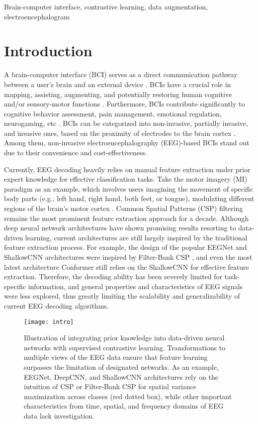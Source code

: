 \documentclass[journal]{IEEEtran}
\begin{document}
\begin{IEEEkeywords}
Brain-computer interface, contrastive learning, data augmentation, electroencephalogram
\end{IEEEkeywords}

\section{Introduction}
A brain-computer interface (BCI) serves as a direct communication pathway between a user's brain and an external device \cite{Rosenfeld2017}. BCIs have a crucial role in mapping, assisting, augmenting, and potentially restoring human cognitive and/or sensory-motor functions \cite{Krucoff2016}. Furthermore, BCIs contribute significantly to cognitive behavior assessment, pain management, emotional regulation, neurogaming, etc \cite{van2012brain}. BCIs can be categorized into non-invasive, partially invasive, and invasive ones, based on the proximity of electrodes to the brain cortex \cite{wu2020transfer}. Among them, non-invasive electroencephalography (EEG)-based BCIs stand out due to their convenience and cost-effectiveness.

Currently, EEG decoding heavily relies on manual feature extraction under prior expert knowledge for effective classification tasks. Take the motor imagery (MI) \cite{Pfurtscheller2001} paradigm as an example, which involves users imagining the movement of specific body parts (e.g., left hand, right hand, both feet, or tongue), modulating different regions of the brain’s motor cortex \cite{Wu2022NN}. Common Spatial Patterns (CSP) \cite{Blankertz2008} filtering remains the most prominent feature extraction approach for a decade. Although deep neural network architectures have shown promising results resorting to data-driven learning, current architectures are still largely inspired by the traditional feature extraction process. For example, the design of the popular EEGNet \cite{Lawhern2018EEGNet} and ShallowCNN \cite{deepshallow2017} architectures were inspired by Filter-Bank CSP \cite{Ang2008}, and even the most latest architecture Conformer \cite{song2022conformer} still relies on the ShallowCNN for effective feature extraction. Therefore, the decoding ability has been severely limited for task-specific information, and general properties and characteristics of EEG signals were less explored, thus greatly limiting the scalability and generalizability of current EEG decoding algorithms.

\begin{figure}[htpb] \centering
\texttt{[image: intro]}
\caption{Illustration of integrating prior knowledge into data-driven neural networks with supervised contrastive learning. Transformations to multiple views of the EEG data ensure that feature learning surpasses the limitation of designated networks. As an example, EEGNet, DeepCNN, and ShallowCNN architectures rely on the intuition of CSP or Filter-Bank CSP for spatial variance maximization across classes (red dotted box), while other important characteristics from time, spatial, and frequency domains of EEG data lack investigation.} \label{fig:intro}
\end{figure}
\end{document}
